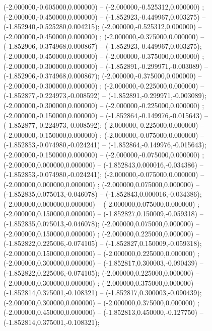  (-2.000000,-0.605000,0.000000) -- (-2.000000,-0.525312,0.000000) ;
 (-2.000000,-0.450000,0.000000) -- (-1.852923,-0.449967,0.003275) -- (-1.852940,-0.525280,0.004215);
 (-2.000000,-0.525312,0.000000) -- (-2.000000,-0.450000,0.000000) ;
 (-2.000000,-0.375000,0.000000) -- (-1.852906,-0.374968,0.000867) -- (-1.852923,-0.449967,0.003275);
 (-2.000000,-0.450000,0.000000) -- (-2.000000,-0.375000,0.000000) ;
 (-2.000000,-0.300000,0.000000) -- (-1.852891,-0.299971,-0.003089) -- (-1.852906,-0.374968,0.000867);
 (-2.000000,-0.375000,0.000000) -- (-2.000000,-0.300000,0.000000) ;
 (-2.000000,-0.225000,0.000000) -- (-1.852877,-0.224973,-0.008592) -- (-1.852891,-0.299971,-0.003089);
 (-2.000000,-0.300000,0.000000) -- (-2.000000,-0.225000,0.000000) ;
 (-2.000000,-0.150000,0.000000) -- (-1.852864,-0.149976,-0.015643) -- (-1.852877,-0.224973,-0.008592);
 (-2.000000,-0.225000,0.000000) -- (-2.000000,-0.150000,0.000000) ;
 (-2.000000,-0.075000,0.000000) -- (-1.852853,-0.074980,-0.024241) -- (-1.852864,-0.149976,-0.015643);
 (-2.000000,-0.150000,0.000000) -- (-2.000000,-0.075000,0.000000) ;
 (-2.000000,0.000000,0.000000) -- (-1.852843,0.000016,-0.034386) -- (-1.852853,-0.074980,-0.024241);
 (-2.000000,-0.075000,0.000000) -- (-2.000000,0.000000,0.000000) ;
 (-2.000000,0.075000,0.000000) -- (-1.852835,0.075013,-0.046078) -- (-1.852843,0.000016,-0.034386);
 (-2.000000,0.000000,0.000000) -- (-2.000000,0.075000,0.000000) ;
 (-2.000000,0.150000,0.000000) -- (-1.852827,0.150009,-0.059318) -- (-1.852835,0.075013,-0.046078);
 (-2.000000,0.075000,0.000000) -- (-2.000000,0.150000,0.000000) ;
 (-2.000000,0.225000,0.000000) -- (-1.852822,0.225006,-0.074105) -- (-1.852827,0.150009,-0.059318);
 (-2.000000,0.150000,0.000000) -- (-2.000000,0.225000,0.000000) ;
 (-2.000000,0.300000,0.000000) -- (-1.852817,0.300003,-0.090439) -- (-1.852822,0.225006,-0.074105);
 (-2.000000,0.225000,0.000000) -- (-2.000000,0.300000,0.000000) ;
 (-2.000000,0.375000,0.000000) -- (-1.852814,0.375001,-0.108321) -- (-1.852817,0.300003,-0.090439);
 (-2.000000,0.300000,0.000000) -- (-2.000000,0.375000,0.000000) ;
 (-2.000000,0.450000,0.000000) -- (-1.852813,0.450000,-0.127750) -- (-1.852814,0.375001,-0.108321);
